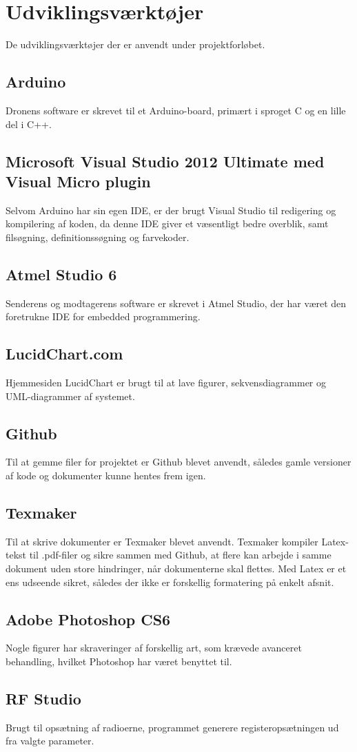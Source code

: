 \documentclass[Main]{subfiles}
\begin{document}
\section{Udviklingsværktøjer}
De udviklingsværktøjer der er anvendt under projektforløbet.

\subsection{Arduino}
Dronens software er skrevet til et Arduino-board, primært i sproget C og en lille del i C++.

\subsection{Microsoft Visual Studio 2012 Ultimate med Visual Micro plugin}
Selvom Arduino har sin egen IDE, er der brugt Visual Studio til redigering og kompilering af koden, da denne IDE giver et væsentligt bedre overblik, samt filsøgning, definitionssøgning og farvekoder.

\subsection{Atmel Studio 6}
Senderens og modtagerens software er skrevet i Atmel Studio, der har været den foretrukne IDE for embedded programmering.

\subsection{LucidChart.com}
Hjemmesiden LucidChart er brugt til at lave figurer, sekvensdiagrammer og UML-diagrammer af systemet.

\subsection{Github}
Til at gemme filer for projektet er Github blevet anvendt, således gamle versioner af kode og dokumenter kunne hentes frem igen.

\subsection{Texmaker}
Til at skrive dokumenter er Texmaker blevet anvendt.
Texmaker kompiler Latex-tekst til .pdf-filer og sikre sammen med Github, at flere kan arbejde i samme dokument uden store hindringer, når dokumenterne skal flettes.
Med Latex er et ens udseende sikret, således der ikke er forskellig formatering på enkelt afsnit.

\subsection{Adobe Photoshop CS6}
Nogle figurer har skraveringer af forskellig art, som krævede avanceret behandling, hvilket Photoshop har været benyttet til.

\subsection{RF Studio}
Brugt til opsætning af radioerne, programmet generere registeropsætningen ud fra valgte parameter.
\end{document}
